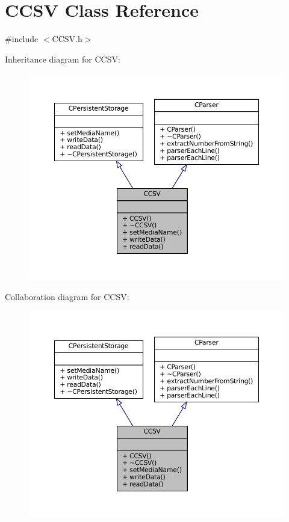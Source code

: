 \hypertarget{classCCSV}{}\section{C\+C\+SV Class Reference}
\label{classCCSV}


{\ttfamily \#include $<$C\+C\+S\+V.\+h$>$}



Inheritance diagram for C\+C\+SV\+:
\nopagebreak
\begin{figure}[H]
\begin{center}
\leavevmode
\includegraphics[width=350pt]{classCCSV__inherit__graph}
\end{center}
\end{figure}


Collaboration diagram for C\+C\+SV\+:
\nopagebreak
\begin{figure}[H]
\begin{center}
\leavevmode
\includegraphics[width=350pt]{classCCSV__coll__graph}
\end{center}
\end{figure}
